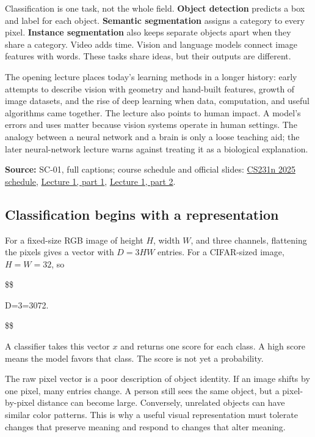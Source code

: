 Classification is one task, not the whole field. \textbf{Object detection} predicts a box and label for each object. \textbf{Semantic segmentation} assigns a category to every pixel. \textbf{Instance segmentation} also keeps separate objects apart when they share a category. Video adds time. Vision and language models connect image features with words. These tasks share ideas, but their outputs are different.

The opening lecture places today's learning methods in a longer history: early attempts to describe vision with geometry and hand-built features, growth of image datasets, and the rise of deep learning when data, computation, and useful algorithms came together. The lecture also points to human impact. A model's errors and uses matter because vision systems operate in human settings. The analogy between a neural network and a brain is only a loose teaching aid; the later neural-network lecture warns against treating it as a biological explanation.

\textbf{Source:} SC-01, full captions; course schedule and official slides: \href{https://cs231n.stanford.edu/2025/schedule.html}{CS231n 2025 schedule}, \href{https://cs231n.stanford.edu/slides/2025/lecture_1_part_1.pdf}{Lecture 1, part 1}, \href{https://cs231n.stanford.edu/slides/2025/lecture_1_part_2.pdf}{Lecture 1, part 2}.

\subsection{Classification begins with a representation}\label{04-visual-computing-ii-ch031-classification-begins-with-a-representation}

For a fixed-size RGB image of height \(H\), width \(W\), and three channels, flattening the pixels gives a vector with \(D=3HW\) entries. For a CIFAR-sized image, \(H=W=32\), so

\$\$

D=3=3072.

\$\$

A classifier takes this vector \(x\) and returns one score for each class. A high score means the model favors that class. The score is not yet a probability.

The raw pixel vector is a poor description of object identity. If an image shifts by one pixel, many entries change. A person still sees the same object, but a pixel-by-pixel distance can become large. Conversely, unrelated objects can have similar color patterns. This is why a useful visual representation must tolerate changes that preserve meaning and respond to changes that alter meaning.

